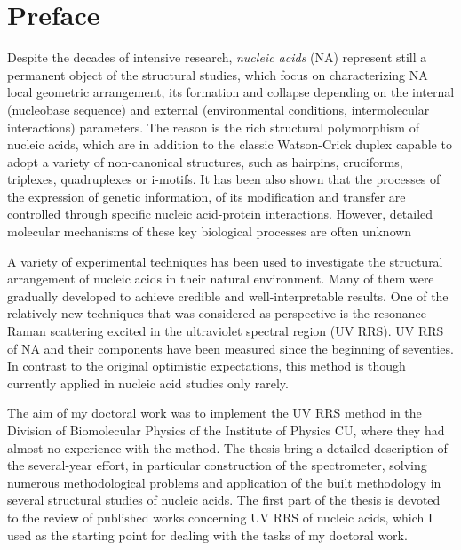 \chapter*{Preface}

Despite the decades of intensive research, \emph{nucleic acids} (NA) represent
still a permanent object of the structural studies, which focus on
characterizing NA local geometric arrangement, its formation and collapse
depending on the internal (nucleobase sequence) and external (environmental
conditions, intermolecular interactions) parameters.
The reason is the rich structural polymorphism of nucleic acids, which are in
addition to the classic Watson-Crick duplex capable to adopt a variety of
non-canonical structures, such as hairpins, cruciforms, triplexes, quadruplexes
or i-motifs.
It has been also shown that the processes of the expression of genetic
information, of its modification and transfer are controlled through specific
nucleic acid-protein interactions.
However, detailed molecular mechanisms of these key biological processes are
often unknown
\parencite{%
	Bansal2014,%
	Kaushik2016,%
	Yamamoto2021%
}

A variety of experimental techniques has been used to investigate the
structural arrangement of nucleic acids in their natural environment.
Many of them were gradually developed to achieve credible and
well-interpretable results.
One of the relatively new techniques that was considered as perspective is the
resonance Raman scattering excited in the ultraviolet spectral region (UV RRS).
UV RRS of NA and their components have been measured since the beginning of
seventies.
In contrast to the original optimistic expectations, this method is though
currently applied in nucleic acid studies only rarely.

The aim of my doctoral work was to implement the UV RRS method in the Division
of Biomolecular Physics of the Institute of Physics CU, where they had almost
no experience with the method.
The thesis bring a detailed description of the several-year effort, in
particular construction of the spectrometer, solving numerous methodological
problems and application of the built methodology in several structural studies
of nucleic acids.
The first part of the thesis is devoted to the review of published works
concerning UV RRS of nucleic acids, which I used as the starting point for
dealing with the tasks of my doctoral work.
